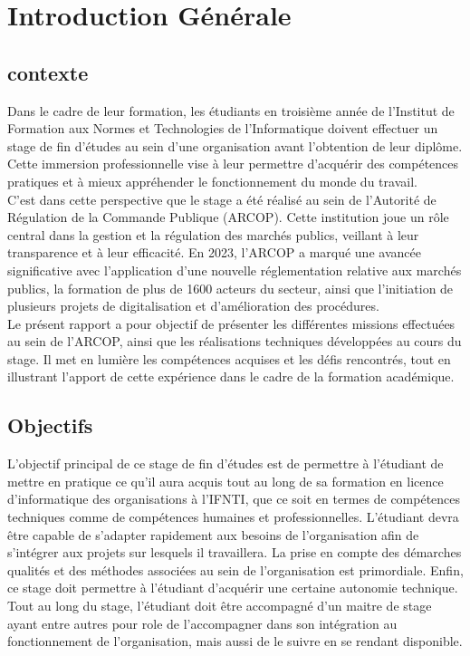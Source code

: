 \chapter*{Introduction Générale}
\thispagestyle{empty}
\clearpage
\section*{contexte}
\thispagestyle{empty}


Dans le cadre de leur formation, les étudiants en troisième année de l'Institut de Formation aux Normes et Technologies de l'Informatique doivent effectuer un stage de fin d’études au sein d’une organisation avant l’obtention de leur diplôme. Cette immersion professionnelle vise à leur permettre d’acquérir des compétences pratiques et à mieux appréhender le fonctionnement du monde du travail.\\

C’est dans cette perspective que le stage a été réalisé au sein de l’Autorité de Régulation de la Commande Publique (ARCOP). Cette institution joue un rôle central dans la gestion et la régulation des marchés publics, veillant à leur transparence et à leur efficacité. En 2023, l’ARCOP a marqué une avancée significative avec l’application d’une nouvelle réglementation relative aux marchés publics, la formation de plus de 1600 acteurs du secteur, ainsi que l’initiation de plusieurs projets de digitalisation et d’amélioration des procédures.\\

Le présent rapport a pour objectif de présenter les différentes missions effectuées au sein de l’ARCOP, ainsi que les réalisations techniques développées au cours du stage. Il met en lumière les compétences acquises et les défis rencontrés, tout en illustrant l’apport de cette expérience dans le cadre de la formation académique.\\

\section*{Objectifs}

L’objectif principal de ce stage de fin d’études est de permettre à l’étudiant de mettre en pratique ce qu’il aura acquis tout au long de sa formation en licence d’informatique des organisations à l’IFNTI, que ce soit en termes de compétences techniques comme de compétences humaines et professionnelles. L’étudiant devra être capable de s’adapter rapidement aux besoins de l’organisation afin de s’intégrer aux projets sur lesquels il travaillera. La prise en compte des démarches qualités et des méthodes associées au sein de l’organisation est primordiale. Enfin, ce stage doit permettre à l’étudiant d’acquérir une certaine autonomie technique.\\
Tout au long du stage, l’étudiant doit être accompagné d’un maitre de stage ayant entre autres pour role de l’accompagner dans son intégration au fonctionnement de l’organisation, mais aussi de le suivre en se rendant disponible.
